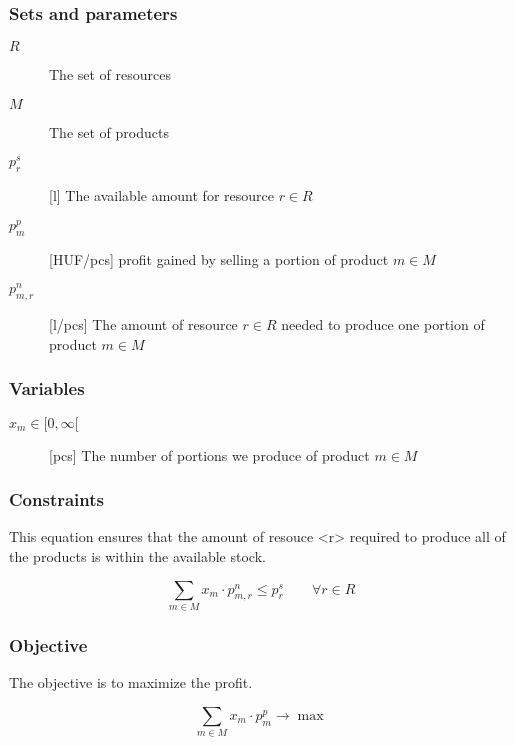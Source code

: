 \documentclass{article}
\begin{document}
    \subsubsection*{Sets and parameters}
    \begin{description}
        \item[$R$] The set of resources
        \item[$M$] The set of products
        \item[$p^s_r$] [l] The available amount for resource $r\in R$
        \item[$p^p_m$] [HUF/pcs] profit gained by selling a portion of product $m\in M$    
        \item[$p^n_{m,r}$] [l/pcs] The amount of resource $r\in R$ needed to produce one portion of product $m\in M$ 
    \end{description}

    \subsubsection*{Variables}

    \begin{description}
        \item[$x_m\in[0,\infty[$] [pcs] The number of portions we produce of product $m\in M$
    \end{description}

    \subsubsection*{Constraints}

    This equation ensures that the amount of resouce <r> required to produce all of the products is within the available stock.

    $$ \sum_{m \in M}x_m\cdot p^n_{m,r} \le p^s_r \qquad \forall r\in R  $$

    \subsubsection*{Objective}

    The objective is to maximize the profit.

    $$ \sum_{m \in M}x_m\cdot p^p_m \to \max $$
\end{document}
